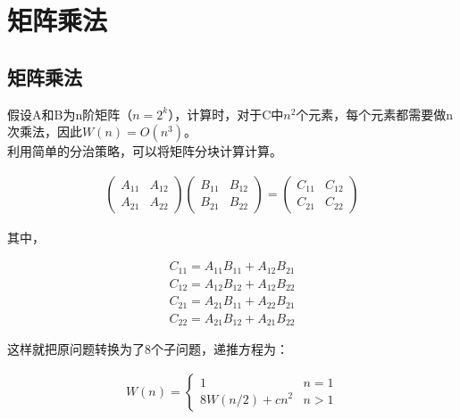 \section{矩阵乘法}

\subsection{矩阵乘法}

假设A和B为n阶矩阵（$ n = 2^k $），计算时，对于C中$ n^2 $个元素，每个元素都需要做n次乘法，因此$ W(n) = O(n^3) $。\\

利用简单的分治策略，可以将矩阵分块计算计算。

\vspace{-0.5cm}

\begin{align*}
	\left( \begin{matrix}
		A_{11} & A_{12} \\
		A_{21} & A_{22}
	\end{matrix} \right)
	\left( \begin{matrix}
		B_{11} & B_{12} \\
		B_{21} & B_{22}
	\end{matrix} \right)
	=
	\left( \begin{matrix}
		C_{11} & C_{12} \\
		C_{21} & C_{22}
	\end{matrix} \right)
\end{align*}

其中，

\vspace{-1cm}

\begin{align*}
	C_{11} = A_{11}B_{11} + A_{12}B_{21} \\
	C_{12} = A_{12}B_{12} + A_{12}B_{22} \\
	C_{21} = A_{21}B_{11} + A_{22}B_{21} \\
	C_{22} = A_{21}B_{12} + A_{21}B_{22}
\end{align*}

这样就把原问题转换为了8个子问题，递推方程为：

\vspace{-0.5cm}

\begin{align*}
	W(n) = \begin{cases}
		1              & n = 1 \\
		8W(n/2) + cn^2 & n > 1
	\end{cases}
\end{align*}

